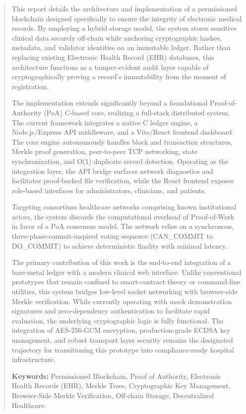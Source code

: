 \documentclass[12pt]{article}
\begin{document}
\begin{abstract}
\fontsize{11pt}{11pt}\selectfont

This report details the architecture and implementation of a permissioned blockchain designed specifically to ensure the integrity of electronic medical records. By employing a hybrid storage model, the system stores sensitive clinical data securely off-chain while anchoring cryptographic hashes, metadata, and validator identities on an immutable ledger. Rather than replacing existing Electronic Health Record (EHR) databases, this architecture functions as a tamper-evident audit layer capable of cryptographically proving a record's immutability from the moment of registration.

The implementation extends significantly beyond a foundational Proof-of-Authority (PoA) C-based core, realizing a full-stack distributed system. The current framework integrates a native C ledger engine, a Node.js/Express API middleware, and a Vite/React frontend dashboard. The core engine autonomously handles block and transaction structures, Merkle proof generation, peer-to-peer TCP networking, state synchronization, and O(1) duplicate record detection. Operating as the integration layer, the API bridge surfaces network diagnostics and facilitates proof-backed file verification, while the React frontend exposes role-based interfaces for administrators, clinicians, and patients.

Targeting consortium healthcare networks comprising known institutional actors, the system discards the computational overhead of Proof-of-Work in favor of a PoA consensus model. The network relies on a synchronous, three-phase-commit-inspired voting sequence (CAN\_COMMIT to DO\_COMMIT) to achieve deterministic finality with minimal latency. 

The primary contribution of this work is the end-to-end integration of a bare-metal ledger with a modern clinical web interface. Unlike conventional prototypes that remain confined to smart-contract theory or command-line utilities, this system bridges low-level socket networking with browser-side Merkle verification. While currently operating with mock demonstration signatures and zero-dependency authentication to facilitate rapid evaluation, the underlying cryptographic logic is fully functional. The integration of AES-256-GCM encryption, production-grade ECDSA key management, and robust transport layer security remains the designated trajectory for transitioning this prototype into compliance-ready hospital infrastructure.


\vspace{1cm}\noindent\textbf{Keywords:} Permissioned Blockchain, Proof of Authority, Electronic Health Records (EHR), Merkle Trees, Cryptographic Key Management, Browser-Side Merkle Verification, Off-chain Storage, Decentralized Healthcare.
\end{abstract}
\end{document}
